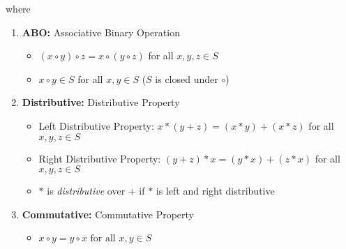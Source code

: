 \documentclass{article}
\theoremstyle{definition}
\begin{document}
\noindent
where

\begin{center}
\begin{enumerate}
\item \textbf{ABO:} Associative Binary Operation 
\begin{itemize}
\item $(x \circ y) \circ z = x \circ  (y \circ z)$  
      for all $x, y, z \in S$
\item $x \circ y \in S$ for all $x, y \in S$
      ($S$ is closed under $\circ$)
\end{itemize}

\item \textbf{Distributive:} Distributive Property 
\begin{itemize}
\item Left Distributive Property:  $x * (y+z )= (x*y) + (x*z)$ for
                                   all $x, y, z \in S$
\item Right Distributive Property: $(y + z) * x = (y*x) + (z*x)$
                                   for all $x, y, z \in S$
\item $*$ is \emph{distributive}   over $+$ if $*$ is left and 
                                   right distributive
\end{itemize}

\item \textbf{Commutative:} Commutative Property
\begin{itemize}
\item $x \circ y = y \circ x {\mbox{ for all }}x,y\in S$
\end{itemize}
\end{enumerate}
\end{center}
%
%
\end{document}
